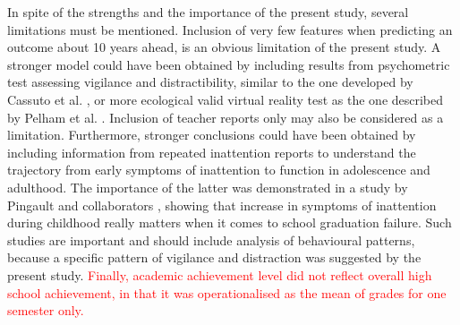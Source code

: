 \documentclass[10pt,letterpaper]{article}
\begin{document}
{{%
%

In spite of the strengths and the importance of the present study, several limitations must be mentioned. Inclusion of very few features when predicting an outcome about 10 years ahead, is an obvious limitation of the present study. A stronger model could have been obtained by including results from psychometric test assessing vigilance and distractibility, similar to the one developed by Cassuto et al. \cite{Cassuto2013}, or more ecological valid virtual reality test as the one described by Pelham et al. \cite{Pelham2011}. Inclusion of teacher reports only may also be considered as a limitation.  Furthermore, stronger conclusions could have been obtained by including information from repeated inattention reports to understand the trajectory from early symptoms of inattention to function in adolescence and adulthood. The importance of the latter was demonstrated in a study by Pingault and collaborators \cite{Pingault2014}, showing that increase in symptoms of inattention during childhood really matters when it comes to school graduation failure. Such studies are important and should include analysis of behavioural patterns, because a specific pattern of vigilance and distraction was suggested by the present study. \textcolor{red}{Finally, academic achievement level did not reflect overall high school achievement, in that it was operationalised as the mean of grades for one semester only.}\\



}}
\end{document}
